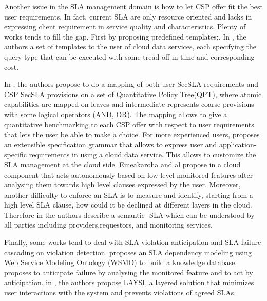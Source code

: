 Another issue in the SLA management domain is how to let CSP offer fit the best user requirements. In fact, current SLA are only resource oriented and lacks in expressing client requirement in service quality and characteristics. Plenty of works tends to fill the gap. First by proposing predefined templates;. In \cite{Ortiz:2013:VPS:2486767.2486772}, the authors
  a set of templates to the user of cloud data services, each specifying the query type that can be executed with some tread-off in time and corresponding cost. 
  
  In \cite{LunaGarcia:2012:BCS:2381913.2381932,}, the authors propose to do a mapping of both user SecSLA requirements and CSP SecSLA provisions on a set of Quantitative Policy Tree(QPT), where atomic capabilities are mapped on leaves and intermediate represents coarse provisions with some logical operators (AND, OR). The mapping allows to give a quantitative benchmarking to each CSP offer with respect to user requirements that lets the user be able to make a choice. For more experienced users, \cite{6313668} proposes an extensible specification grammar that allows to express user and application-specific requirements in using a cloud data service. This allows to customize the SLA management at the cloud side. Emeakaroha and al propose in \cite{5547150}  a cloud component that acts autonomously based on low level monitored features after analysing them towards high level clauses expressed by the user. Moreover, another difficulty to enforce an SLA is to measure and identify, starting from a high level SLA clause, how could it be declined at different layers in the cloud. Therefore in  \cite{Dastjerdi:2012:DOA:2275356.2275360}  the authors describe a semantic- SLA which can be understood by all parties including providers,requestors, and monitoring services. 
  
Finally, some works tend to deal with SLA violation anticipation and SLA failure cascading on violation detection.  \cite{Dastjerdi:2012:DOA:2275356.2275360}  proposes an SLA dependency modeling using Web Service Modeling Ontology (WSMO) to build a knowledge database. \cite{5614035} proposes to anticipate failure by analysing the monitored feature and to act by anticipation. in
\cite{5614035}, the authors propose LAYSI, a layered solution that minimizes user interactions with the system and prevents violations of agreed SLAs.

 
